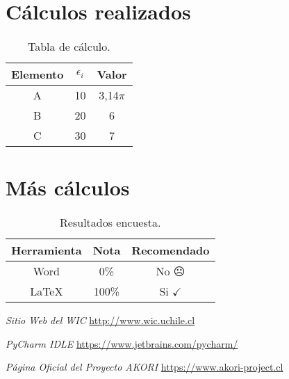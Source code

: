 \newpage
\begin{anexo}
	\section{Cálculos realizados}
	
		\lipsum[69]
		
		
		\lipsum[10]
		
		\begin{table}[htbp]
			\centering
			\caption{Tabla de cálculo.}
			\begin{tabular}{ccc}
				\hline
				\textbf{Elemento} & $\epsilon_i$ & \boldmath{}\textbf{Valor}\unboldmath{} \bigstrut\\
				\hline
				A     & 10    & 3,14$\pi$ \bigstrut[t]\\
				B     & 20    & 6 \\
				C     & 30    & 7 \\
				\end{tabular}
			\label{tab:anexo-1}
		\end{table}
	
	\newpage
	\section{Más cálculos}
	
		\lipsum[1]\newp\lipsum[4]
		
		\begin{table}[htbp]
			\centering
			\caption{Resultados encuesta.}
			\begin{tabular}{ccc}
				\hline
				\textbf{Herramienta} & \textbf{Nota} & \textbf{Recomendado} \bigstrut\\
				\hline
				Word  & 0\%   & No $\frownie$\\
				\LaTeX & 100\% & Si $\checkmark$ \\
			\end{tabular}
			\label{tab:anexo-2}
		\end{table}
		
\end{anexo}

\newpage %
\begin{references}
	\textit{Sitio Web del WIC}
	\url{http://www.wic.uchile.cl}
	
	\textit{PyCharm IDLE}
	\url{https://www.jetbrains.com/pycharm/}
	
	\textit{Página Oficial del Proyecto AKORI} 
	\url{https://www.akori-project.cl}
\end{references}
